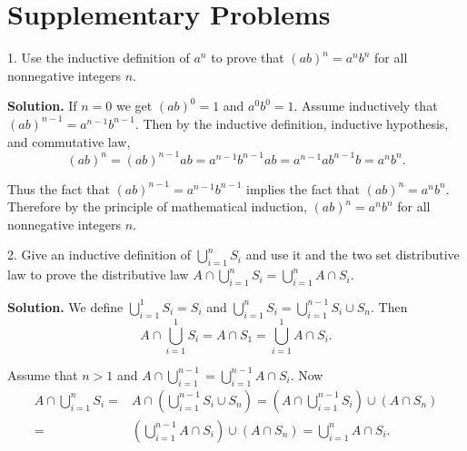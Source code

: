 \documentclass[10pt,]{book}
\theoremstyle{plain}
\theoremstyle{definition}
\theoremstyle{definition}
\numberwithin{equation}{chapter}
\newcommand{\amp}{&}
\begin{document}
\section[{Supplementary Problems}]{Supplementary Problems}\label{sec_induction-suppprobs}
\begin{exerciselist}
\item[1.]\hypertarget{exercise-13}{}Use the inductive definition of \(a^n\) to prove that \((ab)^n=a^nb^n\) for all nonnegative integers \(n\).%
\par\smallskip
\par\smallskip
\noindent\textbf{Solution.}\hypertarget{solution-180}{}\quad
If \(n=0\) we get \((ab)^0=1\) and \(a^0b^0=1\). Assume inductively that \((ab)^{n-1}=a^{n-1}b^{n-1}\). Then by the inductive definition, inductive hypothesis, and commutative law,%
\begin{equation*}
(ab)^n= (ab)^{n-1}ab=a^{n-1}b^{n-1}ab=a^{n-1}ab^{n-1}b=a^nb^n.
\end{equation*}
%
\par
Thus the fact that \((ab)^{n-1}=a^{n-1}b^{n-1}\) implies the fact that \((ab)^n=
a^nb^n\). Therefore by the principle of mathematical induction, \((ab)^n=a^nb^n\) for all nonnegative integers \(n\).%
\item[2.]\hypertarget{exercise-14}{}Give an inductive definition of \(\displaystyle \bigcup_{i=1}^nS_i\) and use it and the two set distributive law to prove the distributive law \(\displaystyle{A\cap \bigcup_{i=1}^n S_i=\bigcup_{i=1}^n A\cap S_i}\).%
\par\smallskip
\par\smallskip
\noindent\textbf{Solution.}\hypertarget{solution-181}{}\quad
We define \(\displaystyle\bigcup_{i=1}^1S_i= S_i\) and \(\displaystyle
\bigcup_{i=1}^n S_i =
\bigcup_{i=1}^{n-1}S_i
\cup S_n\). Then%
\begin{equation*}
\displaystyle A\cap\bigcup_{i=1}^1S_i=
A\cap S_1=\bigcup_{i=1}^1 A\cap S_i.
\end{equation*}
%
\par
Assume that \(n>1\) and \(\displaystyle A\cap\bigcup_{i=1}^{n-1}=\bigcup_{i=1}^{n-1}A\cap S_i\). Now%
\begin{align*}
A\cap\bigcup_{i=1}^nS_i  =\amp  A\cap\left(\bigcup_{i=1}^{n-1}S_i
\cup S_n\right)=\left(A\cap\bigcup_{i=1}^{n-1}S_i\right) \cup\left( A\cap
S_n\right)\\
=\amp \left(\bigcup_{i=1}^{n-1}A\cap
S_i\right)\cup\left(A\cap S_n\right)=\bigcup_{i=1}^n A\cap S_i.
\end{align*}

\end{exerciselist}
\end{document}
